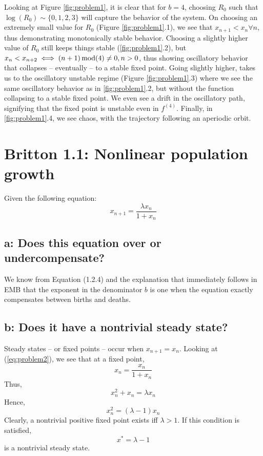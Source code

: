 \documentclass[english]{article}
\newcommand{\mod}{\,{\rm mod}}
\begin{document}
Looking at Figure \ref{fig:problem1}, it is clear that for $b=4$, choosing 
$R_{0}$ such that $\log(R_{0}) \sim \{0,1,2,3\}$ will capture the behavior of 
the system. On choosing an extremely small value for $R_{0}$ 
(Figure \ref{fig:problem1}.1), we see that $x_{n+1} < x_{n} \forall n$, thus
demonstrating monotonically stable behavior. Choosing a slightly higher value
of $R_{0}$ still keeps things stable (\ref{fig:problem1}.2), but 
$x_{n} < x_{n+2} \iff (n+1)\mod(4) \neq 0, n>0$, thus showing oscillatory
behavior that collapses -- eventually -- to a stable fixed point. Going slightly
higher, takes us to the oscillatory unstable regime (Figure \ref{fig:problem1}.3)
where we see the same oscillatory behavior as in \ref{fig:problem1}.2, but
without the function collapsing to a stable fixed point. We even see a drift
in the oscillatory path, signifying that the fixed point is unstable even in
$f^{(4)}$. Finally, in \ref{fig:problem1}.4, we see chaos, with the trajectory
following an aperiodic orbit.

\section{Britton 1.1: Nonlinear population growth}
Given the following equation:
\begin{equation}
	x_{n+1} = \frac{\lambda x_{n}}{1+x_{n}}
	\label{eq:problem2}
\end{equation}
\subsection*{a: Does this equation over or undercompensate?}
We know from Equation (1.2.4) and the explanation that immediately follows in 
EMB that the exponent in the denominator $b$ is one when the equation exactly
compensates between births and deaths.
\subsection*{b: Does it have a nontrivial steady state?}
Steady states -- or fixed points -- occur when $x_{n+1}=x_{n}$. Looking at
(\ref{eq:problem2}), we see that at a fixed point,
$$ x_{n} = \frac{x_n}{1+x_n} $$
Thus,
$$ x_n^{2} + x_{n} = \lambda x_n $$
Hence,
$$ x_n^{2} = (\lambda-1)x_n$$
Clearly, a nontrivial positive fixed point exists iff $\lambda > 1$. If this
condition is satisfied,
$$ x^{*} = \lambda - 1 $$ 
is a nontrivial steady state.
\end{document}
